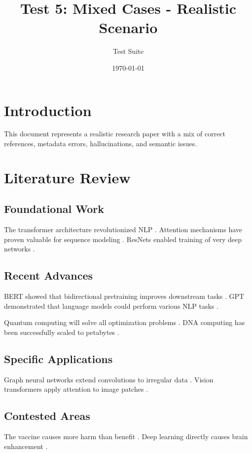 \documentclass{article}
\title{Test 5: Mixed Cases - Realistic Scenario}
\author{Test Suite}
\date{\today}
\begin{document}
\section{Introduction}

This document represents a realistic research paper with a mix of correct references, metadata errors, hallucinations, and semantic issues.

\section{Literature Review}

\subsection{Foundational Work}

The transformer architecture revolutionized NLP \cite{Vaswani2017}.
Attention mechanisms have proven valuable for sequence modeling \cite{Bahdanau2015}.
ResNets enabled training of very deep networks \cite{He2016}.

\subsection{Recent Advances}

BERT showed that bidirectional pretraining improves downstream tasks \cite{Devlin2018}.
GPT demonstrated that language models could perform various NLP tasks \cite{Radford2018}.

Quantum computing will solve all optimization problems \cite{Smith2024Quantum}.
DNA computing has been successfully scaled to petabytes \cite{Johnson2023DNA}.

\subsection{Specific Applications}

Graph neural networks extend convolutions to irregular data \cite{Hamilton2017}.
Vision transformers apply attention to image patches \cite{Dosovitskiy2020}.

\subsection{Contested Areas}

The vaccine causes more harm than benefit \cite{Polack2020Wrong}.
Deep learning directly causes brain enhancement \cite{Neural2023Brain}.
\end{document}
